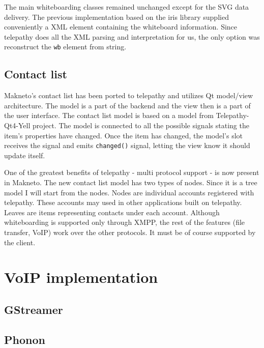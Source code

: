 The main whiteboarding classes remained unchanged except for the SVG data delivery. The previous implementation based on the iris library supplied conveniently a XML element containing the whiteboard information. Since telepathy does all the XML parsing and interpretation for us, the only option was reconstruct the \verb|wb| element from string.  

\section{Contact list}\label{section:contactList}
Makneto's contact list has been ported to telepathy and utilizes Qt model/view architecture. The model is a part of the backend and the view then is a part of the user interface. The contact list model is based on a model from Telepathy-Qt4-Yell project. The model is connected to all the possible signals stating the item's properties have changed. Once the item has changed, the model's slot receives the signal and emits \verb|changed()| signal, letting the view know it should update itself.   

One of the greatest benefits of telepathy - multi protocol support - is now present in Makneto. The new contact list model has two types of nodes. Since it is a tree model I will start from the nodes. Nodes are individual accounts registered with telepathy. These accounts may used in other applications built on telepathy. Leaves are items representing contacts under each account. Although whiteboarding is supported only through XMPP, the rest of the features (file transfer, VoIP) work over the other protocols. It must be of course supported by the client.


\chapter{VoIP implementation}\label{chapter:voip-implementation}

\section{GStreamer}
\section{Phonon}
